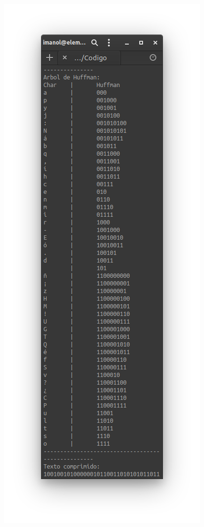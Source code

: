 \begin{itemize}
\begin{figure}[h!]
                    \includegraphics[scale=.5]{Huffman/ejemplos/ejemplo1/ej1-reph.png}
                \end{figure}
                \newpage
        \end{itemize}

